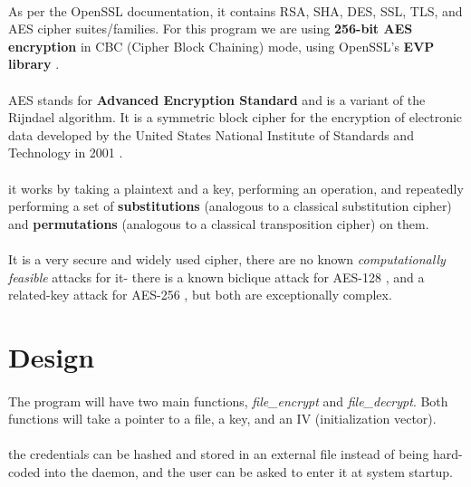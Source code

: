 \documentclass{article}
\begin{document}
    \paragraph{}As per the OpenSSL documentation, it contains RSA, SHA, DES, SSL, TLS, and AES cipher suites/families. For this program we are using \textbf{256-bit AES encryption} in CBC (Cipher Block Chaining) mode, using OpenSSL's \textbf{EVP library} \parencite{openssl_evp}.

    \paragraph{}AES stands for \textbf{Advanced Encryption Standard} and is a variant of the Rijndael algorithm. It is a symmetric block cipher for the encryption of electronic data developed by the United States National Institute of Standards and Technology in 2001 \parencite{aes_256_nist}.
    \paragraph{}it works by taking a plaintext and a key, performing an operation, and repeatedly performing a set of \textbf{substitutions} (analogous to a classical substitution cipher) and \textbf{permutations} (analogous to a classical transposition cipher) on them.
    \paragraph{}It is a very secure and widely used cipher, there are no known \textit{computationally feasible} attacks for it- there is a known biclique attack for AES-128 \parencite{aes_attack}, and a related-key attack for AES-256 \parencite{aes_256_attack} \parencite{aes_256_attack_2}, but both are exceptionally complex.
    

\section{Design}
    \paragraph{}The program will have two main functions, \textit{file\_encrypt} and \textit{file\_decrypt}. Both functions will take a pointer to a file, a key, and an IV (initialization vector).
    \paragraph{}the credentials can be hashed and stored in an external file instead of being hard-coded into the daemon, and the user can be asked to enter it at system startup.
\end{document}
